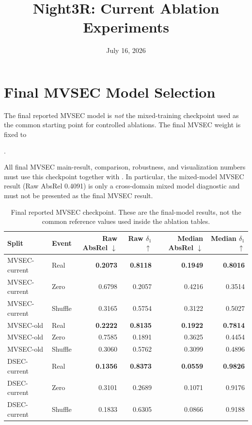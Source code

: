 \documentclass[10pt]{article}
\title{Night3R: Current Ablation Experiments}
\author{}
\date{July 16, 2026}
\newcommand{\best}[1]{\textbf{#1}}
\newcommand{\down}{\ensuremath{\downarrow}}
\newcommand{\up}{\ensuremath{\uparrow}}
\begin{document}
\maketitle

\section{Final MVSEC Model Selection}

The final reported MVSEC model is \emph{not} the mixed-training checkpoint used
as the common starting point for controlled ablations.  The final MVSEC weight
is fixed to
\begin{center}
.
\end{center}
All final MVSEC main-result, comparison, robustness, and visualization numbers
must use this checkpoint together with
.  In particular,
the mixed-model MVSEC result (Raw AbsRel 0.4091) is only a cross-domain mixed
model diagnostic and must not be presented as the final MVSEC result.

\begin{table}[h]
\centering
\caption{Final reported MVSEC checkpoint.  These are the final-model results,
not the common reference values used inside the ablation tables.}
\label{tab:final-mvsec}
\begin{tabular}{llrrrr}
\toprule
Split & Event & Raw AbsRel \down & Raw $\delta_1$ \up & Median AbsRel \down & Median $\delta_1$ \up \\
\midrule
MVSEC-current & Real & \best{0.2073} & \best{0.8118} & \best{0.1949} & \best{0.8016} \\
MVSEC-current & Zero & 0.6798 & 0.2057 & 0.4216 & 0.3514 \\
MVSEC-current & Shuffle & 0.3165 & 0.5754 & 0.3122 & 0.5027 \\
\midrule
MVSEC-old & Real & \best{0.2222} & \best{0.8135} & \best{0.1922} & \best{0.7814} \\
MVSEC-old & Zero & 0.7585 & 0.1891 & 0.3625 & 0.4454 \\
MVSEC-old & Shuffle & 0.3060 & 0.5762 & 0.3099 & 0.4896 \\
\midrule
DSEC-current & Real & \best{0.1356} & \best{0.8373} & \best{0.0559} & \best{0.9826} \\
DSEC-current & Zero & 0.3101 & 0.2689 & 0.1071 & 0.9176 \\
DSEC-current & Shuffle & 0.1833 & 0.6305 & 0.0866 & 0.9188 \\
\bottomrule
\end{tabular}
\end{table}
\end{document}

